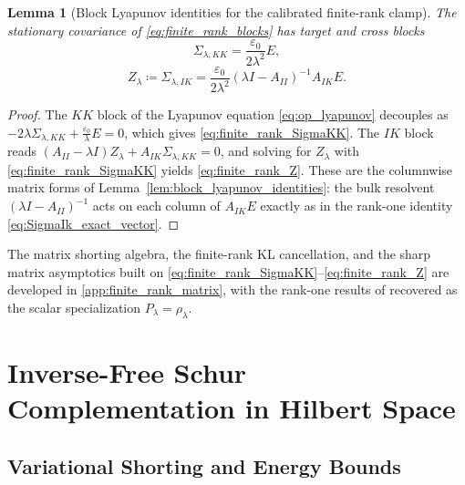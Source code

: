 \documentclass[preprint,12pt]{elsarticle}
\theoremstyle{plain}
\newtheorem{lemma}[theorem]{Lemma}
\theoremstyle{definition}
\theoremstyle{remark}
\begin{document}
    \begin{lemma}[Block Lyapunov identities for the calibrated finite-rank clamp]
        \label{lem:finite_rank_block_identities}
        The stationary covariance of \eqref{eq:finite_rank_blocks} has target and
        cross blocks
        \begin{equation}
            \label{eq:finite_rank_SigmaKK}
            \Sigma_{\lambda,KK}=\frac{\varepsilon_0}{2\lambda^2}E,
        \end{equation}
        \begin{equation}
            \label{eq:finite_rank_Z}
            Z_\lambda\coloneqq\Sigma_{\lambda,IK}
            =\frac{\varepsilon_0}{2\lambda^2}
            (\lambda I-A_{II})^{-1}A_{IK}E.
        \end{equation}
    \end{lemma}
    \begin{proof}
        The $KK$ block of the Lyapunov equation \eqref{eq:op_lyapunov} decouples
        as $-2\lambda\Sigma_{\lambda,KK}+\tfrac{\varepsilon_0}{\lambda}E=0$,
        which gives \eqref{eq:finite_rank_SigmaKK}.  The $IK$ block reads
        $(A_{II}-\lambda I)Z_\lambda+A_{IK}\Sigma_{\lambda,KK}=0$, and solving for
        $Z_\lambda$ with \eqref{eq:finite_rank_SigmaKK} yields
        \eqref{eq:finite_rank_Z}.  These are the columnwise matrix forms of
        Lemma~\ref{lem:block_lyapunov_identities}: the bulk resolvent
        $(\lambda I-A_{II})^{-1}$ acts on each column of $A_{IK}E$ exactly as in
        the rank-one identity \eqref{eq:SigmaIk_exact_vector}.
    \end{proof}

    The matrix shorting algebra, the finite-rank KL cancellation, and the sharp
    matrix asymptotics built on
    \eqref{eq:finite_rank_SigmaKK}--\eqref{eq:finite_rank_Z} are developed in
    \ref{app:finite_rank_matrix}, with the rank-one results of
     recovered as the scalar specialization
    $P_\lambda=\rho_\lambda$.

    \section{Inverse-Free Schur Complementation in Hilbert Space}
    \label{sec:infdim}

    \subsection{Variational Shorting and Energy Bounds}
    \label{sec:infdim:variational}
\end{document}
